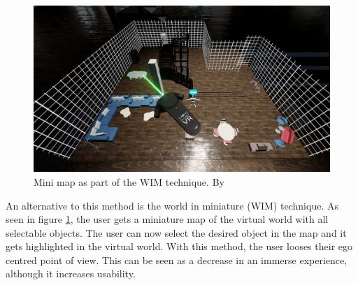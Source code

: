 \begin{figure}[h!]
  \includegraphics[width=14cm]{kapitel/eps/mini-map.pdf}
  \centering
  \caption{Mini map as part of the WIM technique. By \cite{Arnowitz.2017}}
  \label{fig:minimap}
\end{figure}
An alternative to this method is the world in miniature (WIM) technique. As seen in figure \ref{fig:minimap}, the user gets a miniature map of the virtual world with all selectable objects. The user can now select the desired object in the map and it gets highlighted in the virtual world. With this method, the user looses their ego centred point of view. This can be seen as a decrease in an immerse experience, although it increases usability.

